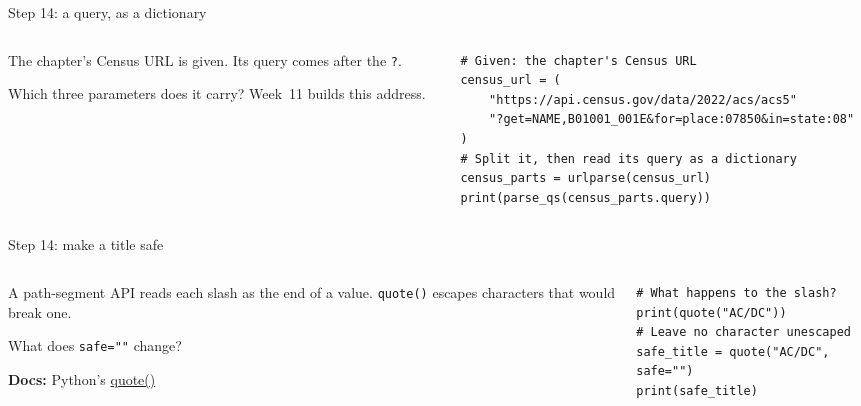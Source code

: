 \documentclass[9pt,aspectratio=169]{beamer}
\begin{document}
\begin{frame}[fragile]{Step 14: a query, as a dictionary}
    \begin{columns}[T]
        \begin{column}{0.37\textwidth}
            The chapter's Census URL is given. Its query comes after the \texttt{?}.

            \medskip
            Which three parameters does it carry? Week~11 builds this address.
        \end{column}
        \begin{column}{0.6\textwidth}
\begin{lstlisting}[style=lab]
# Given: the chapter's Census URL
census_url = (
    "https://api.census.gov/data/2022/acs/acs5"
    "?get=NAME,B01001_001E&for=place:07850&in=state:08"
)
# Split it, then read its query as a dictionary
census_parts = urlparse(census_url)
print(parse_qs(census_parts.query))
\end{lstlisting}
        \end{column}
    \end{columns}
\end{frame}

\begin{frame}[fragile]{Step 14: make a title safe}
    \begin{columns}[T]
        \begin{column}{0.37\textwidth}
            A path-segment API reads each slash as the end of a value. \texttt{quote()} escapes characters that would break one.

            \medskip
            What does \texttt{safe=""} change?

            \medskip
            {\scriptsize\textbf{Docs:} Python's \href{https://docs.python.org/3/library/urllib.parse.html\#urllib.parse.quote}{quote()}\par}
        \end{column}
        \begin{column}{0.6\textwidth}
\begin{lstlisting}[style=lab]
# What happens to the slash?
print(quote("AC/DC"))
# Leave no character unescaped
safe_title = quote("AC/DC", safe="")
print(safe_title)
\end{lstlisting}
        \end{column}
    \end{columns}
\end{frame}
\end{document}
